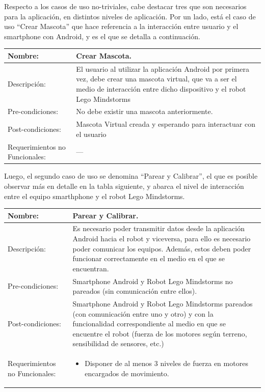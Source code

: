 \documentclass[letterpaper,12pt]{article} %
\numberwithin{equation}{section} %
\numberwithin{figure}{section} %
\numberwithin{table}{section} %
\begin{document}
Respecto a los casos de uso no-triviales, cabe destacar tres que son necesarios para la aplicaci\'on, en distintos niveles de aplicaci\'on. Por un lado, est\'a el caso de uso ``Crear Mascota'' que hace referencia a la interacci\'on entre usuario y el smartphone con Android, y es el que se detalla a continuaci\'on.\\

\begin{table}[H]
  \centering
  \begin{tabular}{p{5cm}p{9cm}}\hline\hline
    Nombre: & Crear Mascota. \\ \hline
    Descripci\'on: & El usuario al utilizar la aplicaci\'on Android por primera vez, debe crear una mascota virtual, que va a ser el medio de interacci\'on entre dicho dispositivo y el robot Lego Mindstorms\\ \hline %
    Pre-condiciones: & No debe existir una mascota anteriormente.\\ \hline
    Post-condiciones: & Mascota Virtual creada y esperando para interactuar con el usuario\\ \hline
    Requerimientos no Funcionales: & ---\\ \hline\hline %
  \end{tabular}
  \label{tab:Crear}
\end{table}

Luego, el segundo caso de uso se denomina ``Parear y Calibrar'', el que es posible observar m\'as en detalle en la tabla siguiente, y abarca el nivel de interacci\'on entre el equipo smarthphone y el robot Lego Mindstorms.\\

\begin{table}[H]
  \centering
  \begin{tabular}{p{5cm}p{9cm}}\hline\hline
    Nombre: & Parear y Calibrar. \\ \hline
    Descripci\'on: & Es necesario poder transmitir datos desde la aplicaci\'on Android hacia el robot y viceversa, para ello es necesario poder comunicar los equipos. Adem\'as, estos deben poder funcionar correctamente en el medio en el que se encuentran.\\ \hline %
    Pre-condiciones: & Smartphone Android y Robot Lego Mindstorms no pareados (sin comunicaci\'on entre ellos).\\ \hline
    Post-condiciones: & Smartphone Android y Robot Lego Mindstorms pareados (con comunicaci\'on entre uno y otro) y con la funcionalidad correspondiente al medio en que se encuentre el robot (fuerza de los motores seg\'un terreno, sensibilidad de sensores, etc.)\\ \hline
    Requerimientos no Funcionales: &
    \begin{itemize}
    \item Disponer de al menos 3 niveles de fuerza en motores encargados de movimiento.
    \end{itemize}\\ \hline\hline %
  \end{tabular}
  \label{tab:Parear}
\end{table}
\end{document}
